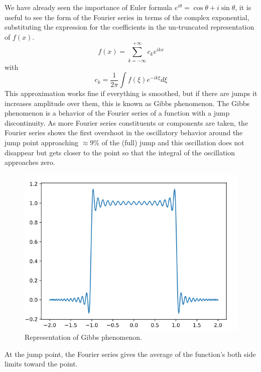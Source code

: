 We have already seen the importance of Euler formula $e^{i\theta}=\cos\theta+i\sin\theta$, it is useful to see the form of the Fourier series in terms of the complex exponential, substituting the expression for the coefficients in the un-truncated representation of $f(x)$.
\begin{equation}\label{eq.complex Fourier}
	f(x)=\displaystyle\sum_{k=-\infty}^{+\infty}c_ke^{ikx}
\end{equation}
with
\begin{equation}
	c_k=\frac{1}{2\pi}\int f(\xi)e^{-ik\xi}d\xi
\end{equation}
This approximation works fine if everything is smoothed, but if there are jumps it increases amplitude over them, this is known as Gibbs phenomenon.
The Gibbs phenomenon is a behavior of the Fourier series of a function with a jump discontinuity. As more Fourier series constituents or components are taken, the Fourier series shows the first overshoot in the oscillatory behavior around the jump point approaching  $\approx9\%$ of the (full) jump and this oscillation does not disappear but gets closer to the point so that the integral of the oscillation approaches zero.
\begin{figure}
	\centering
	\includegraphics[width=0.5\linewidth]{uploads/Screenshot 2024-11-14 170405.png}
	\caption{Representation of Gibbs phenomenon.}
	\label{fig:Gibbs}
\end{figure}
At the jump point, the Fourier series gives the average of the function's both side limits toward the point.

